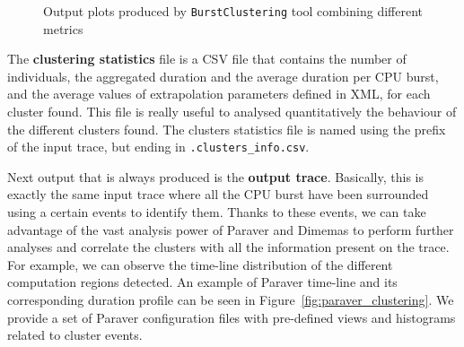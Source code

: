 \documentclass[twoside,a4,english,11pt]{book}
\begin{document}
\begin{figure}
  \caption{Output plots produced by \texttt{BurstClustering} tool combining
  different metrics}
  \label{fig:plots_example}
  
\end{figure}

The \textbf{clustering statistics} file is a CSV file that contains the number
of individuals, the aggregated duration and the average duration per CPU 
burst, and the average values of extrapolation parameters defined in XML,
for each cluster found. This file is really useful to analysed quantitatively
the behaviour of the different clusters found. The clusters statistics file 
is named using the prefix of the input trace, but ending in 
\texttt{.clusters\_info.csv}.


Next output that is always produced is the \textbf{output trace}. Basically,
this is exactly the same input trace where all the CPU burst have been
surrounded using a certain events to identify them. Thanks to these events, we
can take advantage of the vast analysis power of Paraver and Dimemas to 
perform further analyses and correlate the clusters with all the information
present on the trace. For example, we can observe the time-line distribution 
of the different computation regions detected. An example of Paraver 
time-line and its corresponding duration profile can be seen in 
Figure~\ref{fig:paraver_clustering}. We provide a set of Paraver configuration
files with pre-defined views and histograms related to cluster events.
\end{document}

